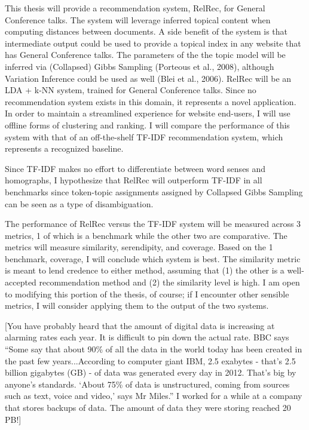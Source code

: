 This thesis will provide a recommendation system, RelRec, for General Conference talks. The system will leverage inferred topical content when computing distances between documents. A side benefit of the system is that intermediate output could be used to provide a topical index in any website that has General Conference talks. The parameters of the the topic model will be inferred via (Collapsed) Gibbs Sampling (Porteous et al., 2008), although Variation Inference could be used as well (Blei et al., 2006). RelRec will be an LDA + k-NN system, trained for General Conference talks. Since no recommendation system exists in this domain, it represents a novel application. In order to maintain a streamlined experience for website end-users, I will use offline forms of clustering and ranking. I will compare the performance of this system with that of an off-the-shelf TF-IDF recommendation system, which represents a recognized baseline.

Since TF-IDF makes no effort to differentiate between word senses and homographs, I hypothesize that RelRec will outperform TF-IDF in all benchmarks since token-topic assignments assigned by Collapsed Gibbs Sampling can be seen as a type of disambiguation.

The performance of RelRec versus the TF-IDF system will be measured across 3 metrics, 1 of which is a benchmark while the other two are comparative. The metrics will measure similarity, serendipity, and coverage. Based on the 1 benchmark, coverage, I will conclude which system is best. The similarity metric is meant to lend credence to either method, assuming that (1) the other is a well-accepted recommendation method and (2) the similarity level is high. I am open to modifying this portion of the thesis, of course; if I encounter other sensible metrics, I will consider applying them to the output of the two systems.




[You have probably heard that the amount of digital data is increasing at alarming rates each year. It is difficult to pin down the actual rate. BBC says ``Some say that about 90\% of all the data in the world today has been created in the past few years...According to computer giant IBM, 2.5 exabytes - that's 2.5 billion gigabytes (GB) - of data was generated every day in 2012. That's big by anyone's standards. ‘About 75\% of data is unstructured, coming from sources such as text, voice and video,’ says Mr Miles.'' I worked for a while at a company that stores backups of data. The amount of data they were storing reached 20 PB!]

